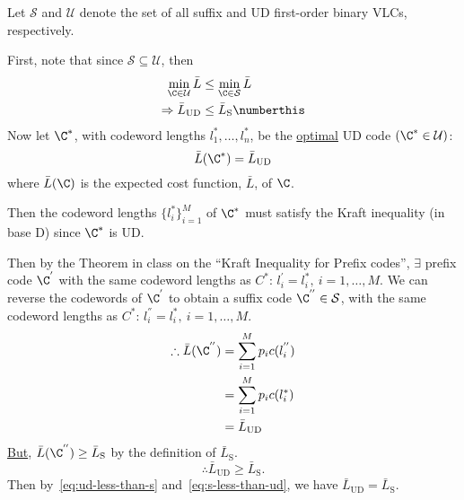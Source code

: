 \documentclass[
  coursecode={MTHE 474},
  assignmentname={Homework \homeworknumber},
  studentnumber=20053722,
  name={Bryan Hoang},
  draft,
]{
  ltxanswer%
}
\begin{document}
  \begin{questions}
    \setcounter{question}{\questionnumber}
    \addtocounter{question}{-1}
    \question[15]\
    \begin{parts}
      \part{}
      \begin{solution}
        Let \(\mathcal{S}\) and \(\mathcal{U}\) denote the set of all suffix and UD first-order binary VLCs, respectively.

        First, note that since \(\mathcal{S}\subseteq\mathcal{U}\), then
        \begin{align*}
          \min_{\C\in\mathcal{U}}\bar{L}  &\le \min_{\C\in\mathcal{S}}\bar{L}                         \\
          \Rightarrow \bar{L}_{\text{UD}} &\le \bar{L}_{\text{S}}\numberthis\label{eq:ud-less-than-s}
        \end{align*}
        Now let \(\C^{*}\), with codeword lengths \(l_{1}^{*},\dotsc,l_{n}^{*}\), be the \underline{optimal} UD code \((\C^{*}\in\mathcal{U})\):
        \begin{equation*}
          \bar{L}(\C^{*}) = \bar{L}_{\text{UD}}
        \end{equation*}
        where \(\bar{L}(\C)\) is the expected cost function, \(\bar{L}\), of \(\C\).

        Then the codeword lengths \(\{l_{i}^{*}\}_{i=1}^{M}\) of \(\C^{*}\) must satisfy the Kraft inequality (in base D) since \(\C^{*}\) is UD.

        Then by the Theorem in class on the ``Kraft Inequality for Prefix codes'', \(\exists\) prefix code \(\C^{'}\) with the same codeword lengths as \(C^{*}\): \(l_{i}^{'}=l_{i}^{*},\ i=1,\dotsc,M\). We can reverse the codewords of \(\C^{'}\) to obtain a suffix code \(\C^{''}\in\mathcal{S}\), with the same codeword lengths as \(C^{*}\): \(l_{i}^{''}=l_{i}^{*},\ i=1,\dotsc,M\).
        \begin{align*}
          \therefore \bar{L}(\C^{''}) &= \sum_{i=1}^{M} p_{i}c(l_{i}^{''}) \\
                                      &= \sum_{i=1}^{M} p_{i}c(l_{i}^{*})  \\
                                      &= \bar{L}_{\text{UD}}
        \end{align*}
        \underline{But}, \(\bar{L}(\C^{''})\ge\bar{L}_{\text{S}}\) by the definition of \(\bar{L}_{\text{S}}\).
        \begin{equation}
          \therefore \bar{L}_{\text{UD}} \ge \bar{L}_{\text{S}}\label{eq:s-less-than-ud}.
        \end{equation}
        Then by~\eqref{eq:ud-less-than-s} and~\eqref{eq:s-less-than-ud}, we have \(\boxed{\bar{L}_{\text{UD}}=\bar{L}_{\text{S}}}\).
      \end{solution}


\end{parts}
\end{questions}
\end{document}
